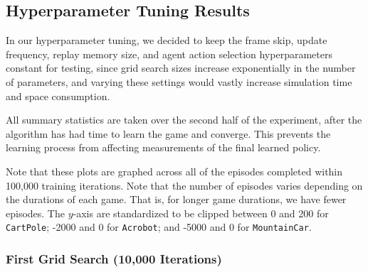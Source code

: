 \documentclass[11pt]{article}
\newcommand{\cp}{\texttt{CartPole}}
\newcommand{\ab}{\texttt{Acrobot}}
\newcommand{\mc}{\texttt{MountainCar}}
\begin{document}




\subsection{Hyperparameter Tuning Results}

In our hyperparameter tuning, we decided to keep the frame skip, update frequency, replay memory size, and agent action selection hyperparameters constant for testing, since grid search sizes increase exponentially in the number of parameters, and varying these settings would vastly increase simulation time and space consumption. 

All summary statistics are taken over the second half of the experiment, after the algorithm has had time to learn the game and converge. This prevents the learning process from affecting measurements of the final learned policy.

Note that these plots are graphed across all of the episodes completed within 100,000 training iterations. Note that the number of episodes varies depending on the durations of each game. That is, for longer game durations, we have fewer episodes. The $y$-axis are standardized to be clipped between 0 and 200 for \cp; -2000 and 0 for \ab; and -5000 and 0 for \mc.

\subsubsection{First Grid Search (10,000 Iterations)}
\end{document}
